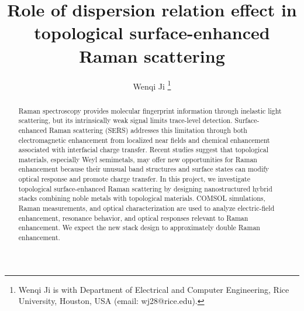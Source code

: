 \documentclass[journal]{IEEEtran}
\begin{document}
\title{Role of dispersion relation effect in topological surface-enhanced Raman scattering
}

\author{Wenqi Ji
\thanks{Wenqi Ji is with Department of Electrical and Computer Engineering, Rice University, Houston, USA (email: wj28@rice.edu).}
}

\maketitle

\begin{abstract}
Raman spectroscopy provides molecular fingerprint information through inelastic light scattering, but its intrinsically weak signal limits trace-level detection. Surface-enhanced Raman scattering (SERS) addresses this limitation through both electromagnetic enhancement from localized near fields and chemical enhancement associated with interfacial charge transfer. Recent studies suggest that topological materials, especially Weyl semimetals, may offer new opportunities for Raman enhancement because their unusual band structures and surface states can modify optical response and promote charge transfer. In this project, we investigate topological surface-enhanced Raman scattering by designing nanostructured hybrid stacks combining noble metals with topological materials. COMSOL simulations, Raman measurements, and optical characterization are used to analyze electric-field enhancement, resonance behavior, and optical responses relevant to Raman enhancement. We expect the new stack design to approximately double Raman enhancement.
\end{abstract}
\end{document}
